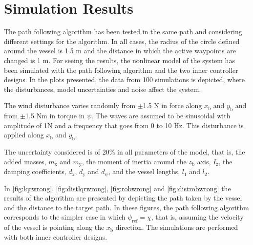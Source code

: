 \section{Simulation Results}
The path following algorithm has been tested in the same path and considering different settings for the algorithm. In all cases, the radius of the circle defined around the vessel is \num{1.5} m and the distance in which the active waypoints are changed is \num{1} m. For seeing the results, the nonlinear model of the system has been simulated with the path following algorithm and the two inner controller designs. In the plots presented, the data from 100 simulations is depicted, where the disturbances, model uncertainties and noise affect the system.

The wind disturbance varies randomly from $\pm$\num{1.5} N in force along $x_\mathrm{b}$ and $y_\mathrm{b}$ and from $\pm$\num{1.5} Nm in torque in $\psi$. The waves are assumed to be sinusoidal with amplitude of 1N and a frequency that goes from 0 to 10 Hz. This disturbance is applied along $x_\mathrm{b}$ and $y_\mathrm{b}$. 

The uncertainty considered is of 20\% in all parameters of the model, that is, the added masses, $m_\mathrm{x}$ and $m_\mathrm{y}$, the moment of inertia around the $z_\mathrm{b}$ axis, $I_\mathrm{z}$, the damping coefficients, $d_\mathrm{x}$, $d_\mathrm{y}$ and $d_\psi$, and the vessel lengths, $l_1$ and $l_2$.  

In \autoref{fig:lqrwrong}, \ref{fig:distlqrwrong}, \ref{fig:robwrong} and \ref{fig:distrobwrong} the results of the algorithm are presented by depicting the path taken by the vessel and the distance to the target path. In these figures, the path following algorithm corresponds to the simpler case in which $\psi_\mathrm{ref} = \chi$, that is, assuming the velocity of the vessel is pointing along the $x_\mathrm{b}$ direction. The simulations are performed with both inner controller designs. 

